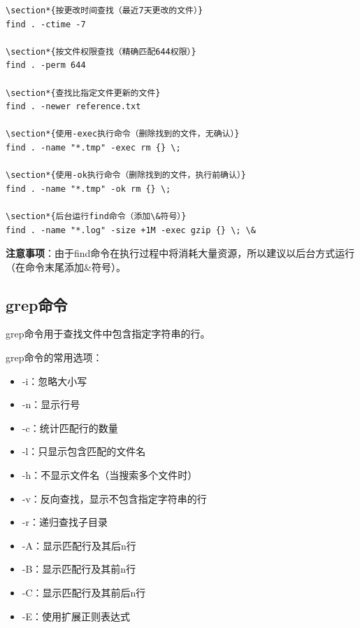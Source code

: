 \documentclass[12pt,UTF8]{ctexbook}
\begin{document}
\begin{verbatim}
\section*{按更改时间查找（最近7天更改的文件）}
find . -ctime -7

\section*{按文件权限查找（精确匹配644权限）}
find . -perm 644

\section*{查找比指定文件更新的文件}
find . -newer reference.txt

\section*{使用-exec执行命令（删除找到的文件，无确认）}
find . -name "*.tmp" -exec rm {} \;

\section*{使用-ok执行命令（删除找到的文件，执行前确认）}
find . -name "*.tmp" -ok rm {} \;

\section*{后台运行find命令（添加\&符号）}
find . -name "*.log" -size +1M -exec gzip {} \; \&
\end{verbatim}

\textbf{注意事项}：由于find命令在执行过程中将消耗大量资源，所以建议以后台方式运行（在命令末尾添加\&符号）。

\subsection{grep命令}
grep命令用于查找文件中包含指定字符串的行。

grep命令的常用选项：
\begin{itemize}
    \item -i：忽略大小写
    \item -n：显示行号
    \item -c：统计匹配行的数量
    \item -l：只显示包含匹配的文件名
    \item -h：不显示文件名（当搜索多个文件时）
    \item -v：反向查找，显示不包含指定字符串的行
    \item -r：递归查找子目录
    \item -A：显示匹配行及其后n行
    \item -B：显示匹配行及其前n行
    \item -C：显示匹配行及其前后n行
    \item -E：使用扩展正则表达式
\end{itemize}
\end{document}
